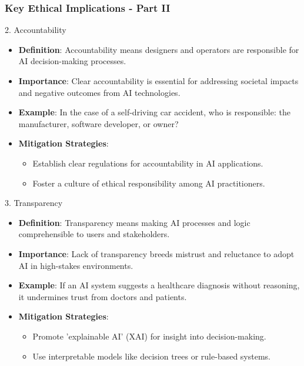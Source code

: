 \documentclass[aspectratio=169]{beamer}
\begin{document}
\begin{frame}[fragile]
    \frametitle{Key Ethical Implications - Part II}
    \begin{block}{2. Accountability}
        \begin{itemize}
            \item \textbf{Definition}: Accountability means designers and operators are responsible for AI decision-making processes.
            \item \textbf{Importance}: Clear accountability is essential for addressing societal impacts and negative outcomes from AI technologies.
            \item \textbf{Example}: In the case of a self-driving car accident, who is responsible: the manufacturer, software developer, or owner?
            \item \textbf{Mitigation Strategies}: 
            \begin{itemize}
                \item Establish clear regulations for accountability in AI applications.
                \item Foster a culture of ethical responsibility among AI practitioners.
            \end{itemize}
        \end{itemize}
    \end{block}

    \begin{block}{3. Transparency}
        \begin{itemize}
            \item \textbf{Definition}: Transparency means making AI processes and logic comprehensible to users and stakeholders.
            \item \textbf{Importance}: Lack of transparency breeds mistrust and reluctance to adopt AI in high-stakes environments.
            \item \textbf{Example}: If an AI system suggests a healthcare diagnosis without reasoning, it undermines trust from doctors and patients.
            \item \textbf{Mitigation Strategies}: 
            \begin{itemize}
                \item Promote 'explainable AI' (XAI) for insight into decision-making.
                \item Use interpretable models like decision trees or rule-based systems.
            \end{itemize}
        \end{itemize}
    \end{block}
\end{frame}
\end{document}
